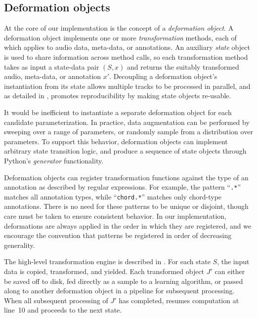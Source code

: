 \documentclass{article}
\begin{document}
\subsection{Deformation objects}

At the core of our implementation is the concept of a \emph{deformation object}.
A deformation object implements one or more \emph{transformation} methods, each of which 
applies to audio data, meta-data, or annotations.  An auxiliary \emph{state} object is used 
to share information across method calls, so each transformation method takes as input a 
state-data pair $(S, x)$ and returns the suitably transformed audio, meta-data, or
annotation $x'$.  Decoupling a deformation object's instantiation from 
its state allows multiple tracks to be processed in parallel, and as detailed in
, promotes reproducibility by making state objects re-usable.

It would be inefficient to instantiate a separate deformation object for each 
candidate parameterization.
In practice, data augmentation can be performed by sweeping over a range of
parameters, or randomly sample from a distribution over parameters.  To support this
behavior, deformation objects can implement arbitrary state transition logic, and produce
a sequence of state objects through Python's \emph{generator} functionality.

Deformation objects can register transformation functions against the type of an
annotation as described by regular expressions.  For example, the pattern ``\texttt{.*}'' 
matches all annotation types, while ``\texttt{chord.*}'' matches only chord-type 
annotations.
There is no need for these patterns to be unique or disjoint, though care must be taken
to ensure consistent behavior.  In our implementation, deformations are always applied in the
order in which they are registered, and we encourage the convention that patterns be
registered in order of decreasing generality.

The high-level transformation engine is described in
.  For each state $S$, the input data is copied, transformed,
and yielded.  Each transformed object $J'$ can either be saved off to disk, fed directly
as a sample to a learning algorithm, or passed along to another deformation object in a
pipeline for subsequent processing.  When all subsequent processing of $J'$ has
completed,  resumes computation at line~10 and proceeds to the 
next state.
\end{document}

